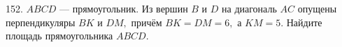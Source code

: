 152. $ABCD$ --- прямоугольник. Из вершин $B$ и $D$ на диагональ $AC$ опущены перпендикуляры $BK$ и $DM,$ причём $BK=DM=6,$ а $KM=5.$ Найдите площадь прямоугольника $ABCD.$\\
